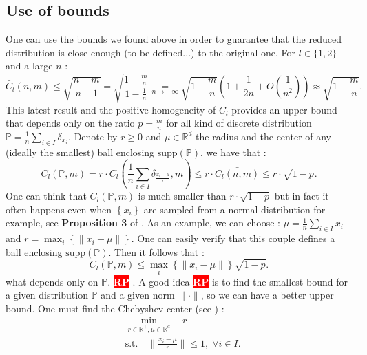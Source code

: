\documentclass{amsart}
\newcommand{\nb}[3]{
		{\colorbox{#2}{\bfseries\sffamily\tiny\textcolor{white}{#1}}}
		{\textcolor{#2}{\text{$\blacktriangleright$}{\textcolor{#2}{#3}}\text{$\blacktriangleleft$}}}}
\newcommand{\rp}[1]{\nb{RP}{red}{#1}}
\newcommand{\RR}{\mathbb{R}}
\begin{document}
\subsection{Use of bounds}
One can use the bounds we found above in order to guarantee that the reduced distribution is close enough (to be defined...) to the original one. For $l\in\{1,2\}$ and a large $n$ : $$\bar{C}_l\left(n,m \right)\leq \sqrt{\frac{n-m}{n-1}}=\sqrt{\frac{1-\frac{m}{n}}{1-\frac{1}{n}}}\underset{n \to +\infty}{=}\sqrt{1-\frac{m}{n}}(1+\frac{1}{2n}+O(\frac{1}{n^2}))\approx \sqrt{1-\frac{m}{n}}.$$
This latest result and the positive homogeneity of $C_l$ provides an upper bound that depends only on the ratio $p=\frac{m}{n}$ for all kind of discrete distribution $\mathbb{P}=\frac{1}{n}\sum_{i\in I}\delta_{x_i}$. Denote by $r\geq 0$ and $\mu\in\mathbb{R}^d$ the radius and the center of any  (ideally the smallest) ball enclosing $\text{supp}(\mathbb{P})$, we have that :
$$
C_l(\mathbb{P},m)=r\cdot C_l(\frac{1}{n}\sum_{i\in I}\delta_{\frac{x_i-\mu}{r}},m)\leq r\cdot \bar{C_l\left(n,m \right)}\leq r\cdot \sqrt{1-p}.
$$
One can think that $C_l(\mathbb{P},m)$ is much smaller than $r\cdot \sqrt{1-p}$ but in fact it often happens even when $\left\{x_i\right\}$ are sampled from a normal distribution for example, see \textbf{Proposition 3} of \cite{rujeerapaiboon_scenario_2022}.
As an example, we can choose : $\mu=\frac{1}{n}\sum_{i\in I}x_i$ and $r=\max_i\left\{{\lVert x_i-\mu\rVert}\right\}$. One can easily verify that this couple defines a ball enclosing $\text{supp}\left(\mathbb{P}\right)$. Then it follows that : 
$$
C_l(\mathbb{P},m)\leq \max_i\left\{{\lVert x_i-\mu\rVert}\right\}\sqrt{1-p}.
$$
what depends only on $\mathbb{P}$. \rp{maybe that helps a very little the article}. A good idea \rp{imo} is to find the smallest bound for a given distribution $\mathbb{P}$ and a given norm $\lVert\cdot\rVert$, so we can have a better upper bound. One must find the Chebyshev center (see ) :
\begin{align*}
    &\min_{r\in\RR^+,\mu\in\RR^d} \quad r\\
    &\text{s.t.}\quad \lVert\frac{x_i-\mu}{r}\rVert \leq 1, \;\forall i\in I.
\end{align*}
\newline
\end{document}
